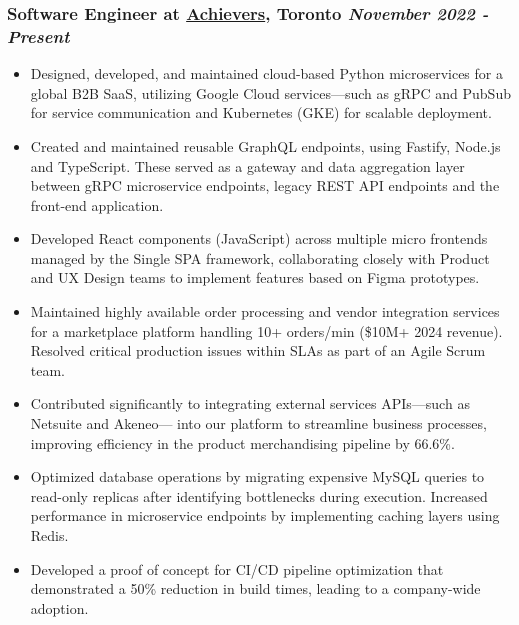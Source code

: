 \documentclass[a4paper,10pt]{article}
\begin{document}
\subsubsection*{%
  \textbf{Software Engineer} at \href{https://www.achievers.com/}{Achievers}, Toronto
  \hfill
  \textit{November 2022 - Present}
}
\begin{itemize}
  \item Designed, developed, and maintained cloud-based Python microservices for a global B2B SaaS, utilizing
    Google Cloud services---such as gRPC and PubSub for service communication and Kubernetes (GKE) for scalable deployment.
  \item Created and maintained reusable GraphQL endpoints, using Fastify, Node.js and TypeScript. These served as a gateway and data
    aggregation layer between gRPC microservice endpoints, legacy REST API endpoints and the front-end application.
  \item Developed React components (JavaScript) across multiple micro frontends managed by the Single SPA framework,
    collaborating closely with Product and UX Design teams to implement features based on Figma prototypes.
  \item Maintained highly available order processing and vendor integration services for a marketplace platform
    handling 10+ orders/min (\$10M+ 2024 revenue). Resolved critical production issues within SLAs as part of an Agile Scrum team.
  \item Contributed significantly to integrating external services APIs---such as Netsuite and Akeneo--- into our platform to streamline
    business processes, improving efficiency in the product merchandising pipeline by 66.6\%.
  \item Optimized database operations by migrating expensive MySQL queries to read-only replicas after identifying
    bottlenecks during execution. Increased performance in microservice endpoints by implementing caching layers
    using Redis.
  \item Developed a proof of concept for CI/CD pipeline optimization that demonstrated
    a 50\% reduction in build times, leading to a company-wide adoption.
\end{itemize}
\end{document}
